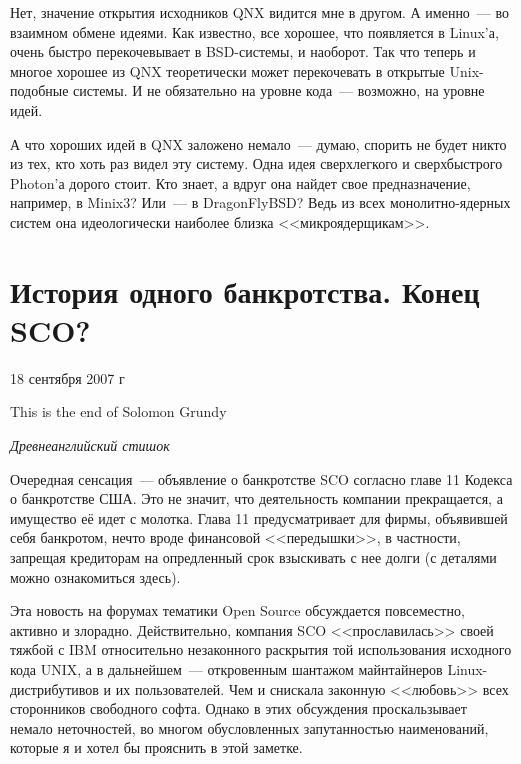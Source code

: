 Нет, значение открытия исходников QNX видится мне в другом. А именно~--- во взаимном обмене идеями. Как известно, все хорошее, что появляется в Linux'а, очень быстро перекочевывает в BSD-системы, и наоборот. Так что теперь и многое хорошее из QNX теоретически может перекочевать в открытые Unix-подобные системы. И не обязательно на уровне кода~--- возможно, на уровне идей.

А что хороших идей в QNX заложено немало~--- думаю, спорить не будет никто из тех, кто хоть раз видел эту систему. Одна идея сверхлегкого и сверхбыстрого Photon'а дорого стоит. Кто знает, а вдруг она найдет свое предназначение, например, в Minix3? Или~--- в DragonFlyBSD? Ведь из всех монолитно-ядерных систем она идеологически наиболее близка <<микроядерщикам>>.

\section{История одного банкротства. Конец SCO?} 
\begin{timeline}18 сентября 2007 г\end{timeline}

\hfill \begin{minipage}[h]{0.45\textwidth}
This is the end of Solomon Grundy
\begin{flushright}
\textit{Древнеанглийский стишок}
\end{flushright}
\bigskip\end{minipage}

Очередная сенсация~--- объявление о банкротстве SCO согласно главе 11 Кодекса о банкротстве США. Это не значит, что деятельность компании прекращается, а имущество её идет с молотка. Глава 11 предусматривает для фирмы, объявившей себя банкротом, нечто вроде финансовой <<передышки>>, в частности, запрещая кредиторам на опредленный срок взыскивать с нее долги (с деталями можно ознакомиться здесь).

Эта новость на форумах тематики Open Source обсуждается повсеместно, активно и злорадно. Действительно, компания SCO <<прославилась>> своей тяжбой с IBM относительно незаконного раскрытия той использования исходного кода UNIX, а в дальнейшем~--- откровенным шантажом майнтайнеров Linux-дистрибутивов и их пользователей. Чем и снискала законную <<любовь>> всех сторонников свободного софта. Однако в этих обсуждения проскальзывает немало неточностей, во многом обусловленных запутанностью наименований, которые я и хотел бы прояснить в этой заметке. 

